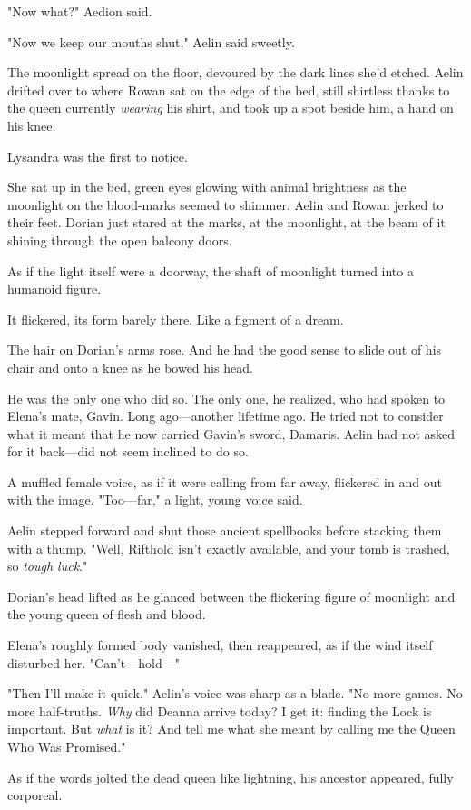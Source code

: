 "Now what?"
Aedion said.

"Now we keep our mouths shut," Aelin said sweetly.

The moonlight spread on the floor, devoured by the dark lines she'd etched.
Aelin drifted over to where Rowan sat on the edge of the bed, still shirtless thanks to the queen currently \emph{wearing} his shirt, and took up a spot beside him, a hand on his knee.

Lysandra was the first to notice.

She sat up in the bed, green eyes glowing with animal brightness as the moonlight on the blood-marks seemed to shimmer.
Aelin and Rowan jerked to their feet.
Dorian just stared at the marks, at the moonlight, at the beam of it shining through the open balcony doors.

As if the light itself were a doorway, the shaft of moonlight turned into a humanoid figure.

It flickered, its form barely there.
Like a figment of a dream.

The hair on Dorian's arms rose.
And he had the good sense to slide out of his chair and onto a knee as he bowed his head.

He was the only one who did so.
The only one, he realized, who had spoken to Elena's mate, Gavin.
Long ago---another lifetime ago.
He tried not to consider what it meant that he now carried Gavin's sword, Damaris.
Aelin had not asked for it back---did not seem inclined to do so.

A muffled female voice, as if it were calling from far away, flickered in and out with the image.
"Too---far," a light, young voice said.

Aelin stepped forward and shut those ancient spellbooks before stacking them with a thump.
"Well, Rifthold isn't exactly available, and your tomb is trashed, so \emph{tough luck}."

Dorian's head lifted as he glanced between the flickering figure of moonlight and the young queen of flesh and blood.

Elena's roughly formed body vanished, then reappeared, as if the wind itself disturbed her.
"Can't---hold---"

"Then I'll make it quick."
Aelin's voice was sharp as a blade.
"No more games.
No more half-truths.
\emph{Why} did Deanna arrive today?
I get it: finding the Lock is important.
But \emph{what} is it?
And tell me what she meant by calling me the Queen Who Was Promised."

As if the words jolted the dead queen like lightning, his ancestor appeared, fully corporeal.

